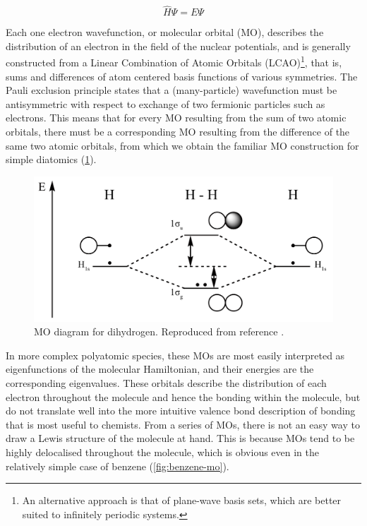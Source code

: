\begin{refsection}
\begin{equation}
    \hat{H}\Psi = E\Psi
    \label{eqn:schrodinger}
\end{equation}

Each one electron wavefunction, or molecular orbital (MO), describes the distribution of an electron in the field of the nuclear potentials, and is generally constructed from a Linear Combination of Atomic Orbitals (LCAO)\footnote{An alternative approach is that of plane-wave basis sets, which are better suited to infinitely periodic systems.}, that is, sums and differences of atom centered basis functions of various symmetries.
The Pauli exclusion principle states that a (many-particle) wavefunction must be antisymmetric with respect to exchange of two fermionic particles such as electrons.
This means that for every MO resulting from the sum of two atomic orbitals, there must be a corresponding MO resulting from the difference of the same two atomic orbitals, from which we obtain the familiar MO construction for simple diatomics (\cref{fig:h-orbital-diagram}).

\begin{figure}
    \includegraphics[width=0.6\linewidth]{Figures/h-orbital-diagram.pdf}
    \caption{MO diagram for dihydrogen. Reproduced from reference \cite{h-orbital-diagram}.}
    \label{fig:h-orbital-diagram}
\end{figure}

In more complex polyatomic species, these MOs are most easily interpreted as eigenfunctions of the molecular Hamiltonian, and their energies are the corresponding eigenvalues. 
These orbitals describe the distribution of each electron throughout the molecule and hence the bonding within the molecule, but do not translate well into the more intuitive valence bond description of bonding that is most useful to chemists.
From a series of MOs, there is not an easy way to draw a Lewis structure of the molecule at hand.
This is because MOs tend to be highly delocalised throughout the molecule, which is obvious even in the relatively simple case of benzene (\cref{fig:benzene-mo}).


\end{refsection}
